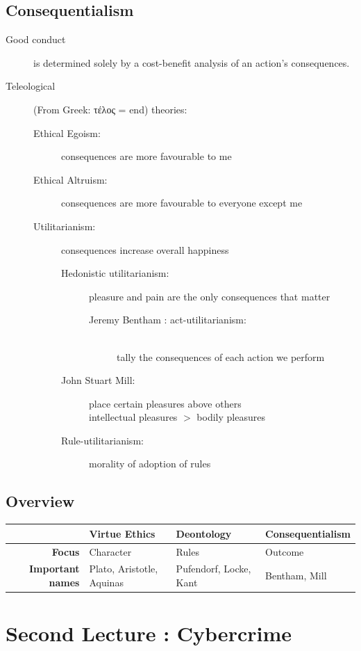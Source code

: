 \documentclass[a4paper]{article}
\begin{document}
\subsection*{Consequentialism}

\begin{description}
\item[Good conduct] is determined solely by a cost-benefit analysis of an action's consequences.
\item[Teleological] (From Greek: τέλος = end) theories:
\begin{description}
\item[Ethical Egoism:] consequences are more favourable to me
\item[Ethical Altruism:] consequences are more favourable to everyone except me
\item[Utilitarianism:] consequences increase overall happiness
\begin{description}
\item[Hedonistic utilitarianism:] pleasure and pain are the only consequences that matter
\begin{description}
\item[Jeremy Bentham : act-utilitarianism:] ~ \\ tally the consequences of each action we perform
\end{description}
\item[John Stuart Mill:] place certain pleasures above others \\ intellectual pleasures $>$ bodily pleasures
\item[Rule-utilitarianism:] morality of adoption of rules
\end{description}
\end{description}
\end{description}

\subsection*{Overview}

\begin{tabular}{r | lll}
& \textbf{Virtue Ethics} & \textbf{Deontology} & \textbf{Consequentialism} \\
\hline
\textbf{Focus} & Character & Rules & Outcome \\
\textbf{Important names} & Plato, Aristotle, Aquinas & Pufendorf, Locke, Kant & Bentham, Mill
\end{tabular}

\section{Second Lecture : Cybercrime}
\end{document}

